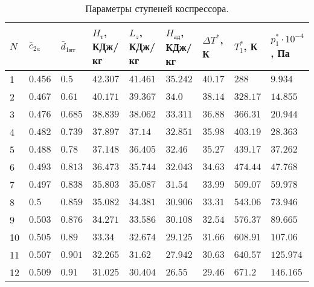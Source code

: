 \documentclass[a4paper,10pt]{article}
\begin{document}
    \begin{longtable}{|p{0.6cm}|p{1.3cm}|p{1.2cm}|p{1.2cm}|p{1.2cm}|p{1.2cm}|p{1.2cm}|p{1.2cm}|p{1.2cm}|}
        \caption{Параметры ступеней коспрессора.}\\ \hline
        $N$ & $\bar{c}_{2a}$ & $\bar{d}_{1вт}$ & $H_т$, КДж/кг & $L_z$, КДж/кг & $H_{ад}$, КДж/кг & $\Delta T^*$, К & $T_1^*$, К&
        $p_1^* \cdot 10^{-4}$, Па   \\ \hline
%        
        1 & $0.456$ & $0.5$ &
        $42.307$ &
        $41.461$ & $35.242$ &
        $40.17$ & $288$ &
        $9.934$  \\ \hline
%        
        2 & $0.467$ & $0.61$ &
        $40.171$ &
        $39.367$ & $34.0$ &
        $38.14$ & $328.17$ &
        $14.855$  \\ \hline
%        
        3 & $0.476$ & $0.685$ &
        $38.839$ &
        $38.062$ & $33.311$ &
        $36.88$ & $366.31$ &
        $20.944$  \\ \hline
%        
        4 & $0.482$ & $0.739$ &
        $37.897$ &
        $37.14$ & $32.851$ &
        $35.98$ & $403.19$ &
        $28.363$  \\ \hline
%        
        5 & $0.488$ & $0.78$ &
        $37.148$ &
        $36.405$ & $32.46$ &
        $35.27$ & $439.17$ &
        $37.262$  \\ \hline
%        
        6 & $0.493$ & $0.813$ &
        $36.473$ &
        $35.744$ & $32.043$ &
        $34.63$ & $474.44$ &
        $47.768$  \\ \hline
%        
        7 & $0.497$ & $0.838$ &
        $35.803$ &
        $35.087$ & $31.54$ &
        $33.99$ & $509.07$ &
        $59.978$  \\ \hline
%        
        8 & $0.5$ & $0.859$ &
        $35.082$ &
        $34.381$ & $30.906$ &
        $33.31$ & $543.06$ &
        $73.946$  \\ \hline
%        
        9 & $0.503$ & $0.876$ &
        $34.271$ &
        $33.586$ & $30.108$ &
        $32.54$ & $576.37$ &
        $89.665$  \\ \hline
%        
        10 & $0.505$ & $0.89$ &
        $33.34$ &
        $32.674$ & $29.125$ &
        $31.66$ & $608.91$ &
        $107.06$  \\ \hline
%        
        11 & $0.507$ & $0.901$ &
        $32.265$ &
        $31.62$ & $27.942$ &
        $30.63$ & $640.57$ &
        $125.974$  \\ \hline
%        
        12 & $0.509$ & $0.91$ &
        $31.025$ &
        $30.404$ & $26.55$ &
        $29.46$ & $671.2$ &
        $146.165$  \\ \hline
%        
    \end{longtable}
\end{document}
